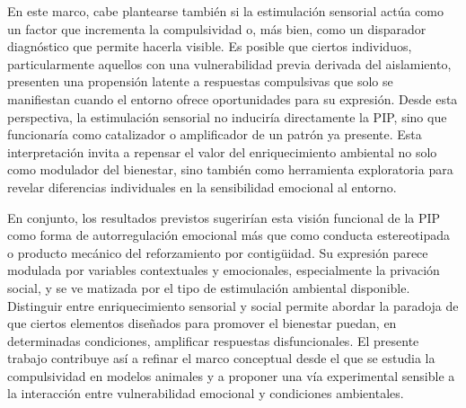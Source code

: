 \documentclass[12pt,a4paper]{article}
\begin{document}
\begin{multicols}{2}
En este marco, cabe plantearse también si la estimulación sensorial actúa como un factor que incrementa la compulsividad o, más bien, como un disparador diagnóstico que permite hacerla visible. Es posible que ciertos individuos, particularmente aquellos con una vulnerabilidad previa derivada del aislamiento, presenten una propensión latente a respuestas compulsivas que solo se manifiestan cuando el entorno ofrece oportunidades para su expresión. Desde esta perspectiva, la estimulación sensorial no induciría directamente la PIP, sino que funcionaría como catalizador o amplificador de un patrón ya presente. Esta interpretación invita a repensar el valor del enriquecimiento ambiental no solo como modulador del bienestar, sino también como herramienta exploratoria para revelar diferencias individuales en la sensibilidad emocional al entorno.

En conjunto, los resultados previstos sugerirían esta visión funcional de la PIP como forma de autorregulación emocional más que como conducta estereotipada o producto mecánico del reforzamiento por contigüidad. Su expresión parece modulada por variables contextuales y emocionales, especialmente la privación social, y se ve matizada por el tipo de estimulación ambiental disponible. Distinguir entre enriquecimiento sensorial y social permite abordar la paradoja de que ciertos elementos diseñados para promover el bienestar puedan, en determinadas condiciones, amplificar respuestas disfuncionales. El presente trabajo contribuye así a refinar el marco conceptual desde el que se estudia la compulsividad en modelos animales y a proponer una vía experimental sensible a la interacción entre vulnerabilidad emocional y condiciones ambientales.





\end{multicols}
\end{document}
